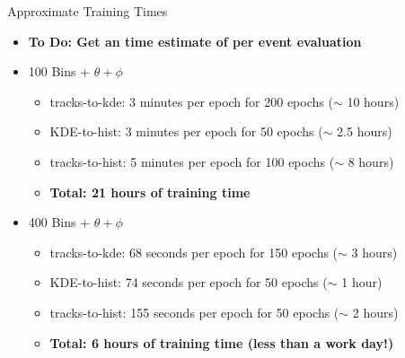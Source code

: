 \documentclass[xcolor=table,aspectratio=169]{beamer}
\begin{document}
\begin{frame}{Approximate Training Times}
    \begin{itemize}
        \item \textbf{To Do: Get an time estimate of per event evaluation}
        \item 100 Bins + \(\theta + \phi\)
        \begin{itemize}
            \item tracks-to-kde: 3 minutes per epoch for 200 epochs (\(\sim\) 10 hours)
            \item KDE-to-hist: 3 minutes per epoch for 50 epochs (\(\sim\) 2.5 hours)
            \item tracks-to-hist: 5 minutes per epoch for 100 epochs (\(\sim\) 8 hours)
            \item \textbf{Total: 21 hours of training time}
        \end{itemize}
        \item 400 Bins + \(\theta + \phi\)
        \begin{itemize}
            \item tracks-to-kde: 68 seconds per epoch for 150 epochs (\(\sim\) 3 hours)
            \item KDE-to-hist: 74 seconds per epoch for 50 epochs (\(\sim\) 1 hour)
            \item tracks-to-hist: 155 seconds per epoch for 50 epochs (\(\sim\) 2 hours)
            \item \textbf{Total: 6 hours of training time (less than a work day!)}
        \end{itemize}
    \end{itemize}
\end{frame}
\end{document}
